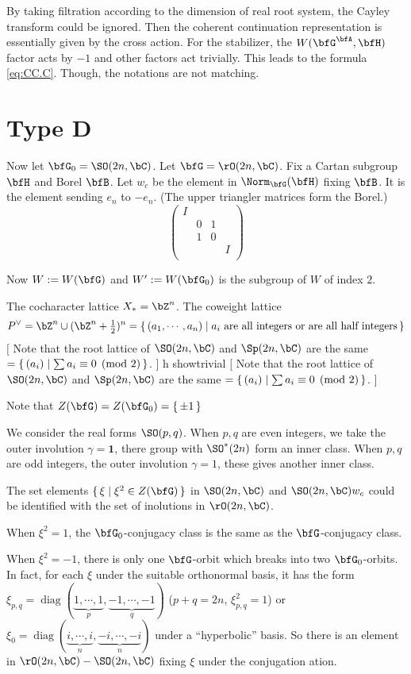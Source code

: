 \documentclass[12pt,a4paper]{amsart}
\newcommand{\trivial}[2][]{\if\relax\detokenize{#1}\relax
  {%
      \color{orange} \vspace{0em} $[$  #2 $]$
      \color{black}
  }
  \else
\ifx#1h
\ifcsname showtrivial\endcsname
{%
    \color{orange} \vspace{0em}  $[$ #2 $]$
    \color{black}
}
\fi
\else {\red Wrong argument!} \fi
\fi
}
\newcommand{\bfone}{\mathbf{1}}
\newcommand{\diag}{\operatorname{diag}}
\numberwithin{equation}{section}
\theoremstyle{remark}
\def\half{{\tfrac{1}{2}}}
\begin{document}
By taking filtration according to the dimension of real root system, the Cayley
transform could be ignored.  Then the coherent continuation representation is
essentially given by the cross action.  For the stabilizer, the
$W(\bfG^\bfA,\bfH)$ factor acts by $-1$ and other factors act trivially.  This
leads to the formula \eqref{eq:CC.C}. {\color{red} Though, the notations are not
  matching.}

\section{Type D}
Now let $\bfG_0=\SO(2n,\bC)$. Let $\bfG = \rO(2n,\bC)$.  Fix a Cartan subgroup
$\bfH$ and Borel $\bfB$.  Let $w_c$ be the element in $\Norm_{\bfG}(\bfH)$
fixing $\bfB$.  It is the element sending $e_n$ to $-e_n$. (The upper triangler
matrices form the Borel.)
\[
  \begin{pmatrix}
    I & & &  \\
    &0 & 1 & \\
    &1 &0  & \\
    & & & I\\
  \end{pmatrix}
\]

Now $W := W(\bfG)$ and $W' := W(\bfG_0)$ is the subgroup of $W$ of index $2$.

The cocharacter lattice $X_*=\bZ^n$.  The coweight lattice
\[ P^\vee = \bZ^n \cup (\bZ^n+\half)^n = \set{(a_1, \cdots, a_n)| a_i \text{ are
      all integers or are all half integers}}
\]
\trivial{ Note that the root lattice of $\SO(2n,\bC)$ and $\Sp(2n,\bC)$ are the
  same $=\set{(a_i)|\sum a_i \equiv 0 \pmod{2}}$.  }

Note that $Z(\bfG)=Z(\bfG_0)=\set{\pm 1}$

We consider the real forms $\SO(p,q)$.  When $p,q$ are even integers, we take
the outer involution $\gamma = \bfone$, there group with $\SO^*(2n)$ form an
inner class.  When $p,q$ are odd integers, the outer involution $\gamma=1$,
these gives another inner class.

The set elements $\set{\xi|\xi^2\in Z(\bfG)}$ in $\SO(2n,\bC)$ and
$\SO(2n,\bC)w_c$ could be identified with the set of inolutions in
$\rO(2n,\bC)$.

When $\xi^2 =1$, the $\bfG_0$-conjugacy class is the same as the
$\bfG$-conjugacy class.

When $\xi^2=-1$, there is only one $\bfG$-orbit which breaks into two
$\bfG_0$-orbits.  In fact, for each $\xi$ under the suitable orthonormal basis,
it has the form
$\xi_{p,q}=\diag(\underbrace{1, \cdots, 1}_p,\underbrace{-1,\cdots,-1}_q )$
($p+q=2n$, $\xi_{p,q}^2=1$) or
$\xi_0 =\diag(\underbrace{i,\cdots, i}_n,\underbrace{-i,\cdots, -i}_n)$ under a
``hyperbolic'' basis. So there is an element in $\rO(2n,\bC)-\SO(2n,\bC)$ fixing
$\xi$ under the conjugation ation.
\end{document}
